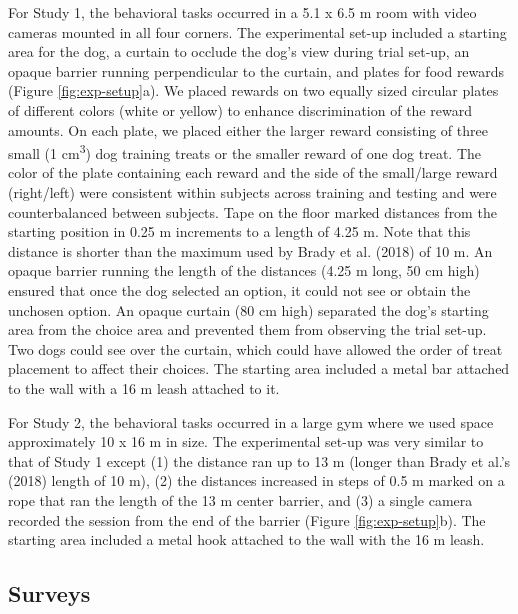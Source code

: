 \documentclass[
  pub,floatsintext]{apa6}
\begin{document}
For Study 1, the behavioral tasks occurred in a 5.1 x 6.5 m room with video cameras mounted in all four corners. The experimental set-up included a starting area for the dog, a curtain to occlude the dog's view during trial set-up, an opaque barrier running perpendicular to the curtain, and plates for food rewards (Figure \ref{fig:exp-setup}a). We placed rewards on two equally sized circular plates of different colors (white or yellow) to enhance discrimination of the reward amounts. On each plate, we placed either the larger reward consisting of three small (1 cm\textsuperscript{3}) dog training treats or the smaller reward of one dog treat. The color of the plate containing each reward and the side of the small/large reward (right/left) were consistent within subjects across training and testing and were counterbalanced between subjects. Tape on the floor marked distances from the starting position in 0.25 m increments to a length of 4.25 m. Note that this distance is shorter than the maximum used by Brady et al. (2018) of 10 m. An opaque barrier running the length of the distances (4.25 m long, 50 cm high) ensured that once the dog selected an option, it could not see or obtain the unchosen option. An opaque curtain (80 cm high) separated the dog's starting area from the choice area and prevented them from observing the trial set-up. Two dogs could see over the curtain, which could have allowed the order of treat placement to affect their choices. The starting area included a metal bar attached to the wall with a 16 m leash attached to it.

For Study 2, the behavioral tasks occurred in a large gym where we used space approximately 10 x 16 m in size. The experimental set-up was very similar to that of Study 1 except (1) the distance ran up to 13 m (longer than Brady et al.'s (2018) length of 10 m), (2) the distances increased in steps of 0.5 m marked on a rope that ran the length of the 13 m center barrier, and (3) a single camera recorded the session from the end of the barrier (Figure \ref{fig:exp-setup}b). The starting area included a metal hook attached to the wall with the 16 m leash.

\hypertarget{surveys}{%
\subsection{Surveys}\label{surveys}}
\end{document}
